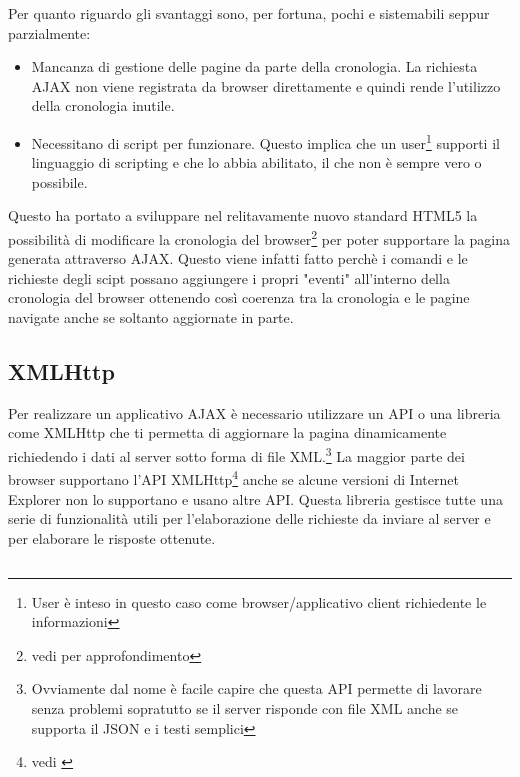 \documentclass[a4paper,14pt]{article}
\begin{document}
Per quanto riguardo gli svantaggi sono, per fortuna, pochi e sistemabili seppur parzialmente:
\begin{itemize}
\item Mancanza di gestione delle pagine da parte della cronologia. La richiesta AJAX non viene registrata da browser direttamente e quindi rende l'utilizzo della cronologia inutile.
\item Necessitano di script per funzionare. Questo implica che un user\footnote{User è inteso in questo caso come browser/applicativo client richiedente le informazioni} supporti il linguaggio di scripting e che lo abbia abilitato, il che non è sempre vero o possibile.
\end{itemize}

Questo ha portato a sviluppare nel relitavamente nuovo standard HTML5 la possibilità di modificare la cronologia del browser\footnote{vedi \cites{site:w3chtml5} per approfondimento} per poter supportare la pagina generata attraverso AJAX. Questo viene infatti fatto perchè i comandi e le richieste degli scipt possano aggiungere i propri "eventi" all'interno della cronologia del browser ottenendo così coerenza tra la cronologia e le pagine navigate anche se soltanto aggiornate in parte.

\subsection{XMLHttp} Per realizzare un applicativo AJAX è necessario utilizzare un API o una libreria come XMLHttp che ti permetta di aggiornare la pagina dinamicamente richiedendo i dati al server sotto forma di file XML.\footnote{Ovviamente dal nome è facile capire che questa API permette di lavorare senza problemi sopratutto se il server risponde con file XML anche se supporta il JSON e i testi semplici} 
La maggior parte dei browser supportano l'API XMLHttp\footnote{vedi \textcites{site:xmlhttpcompatibilita}} anche se alcune versioni di Internet Explorer non lo supportano e usano altre API.
Questa libreria gestisce tutte una serie di funzionalità utili per l'elaborazione delle richieste da inviare al server e per elaborare le risposte ottenute.

\newpage
\subsection*{\refname}
\printbibliography[heading=web, nottype=book]
\printbibliography[heading=libri, type=book]
\end{document}
